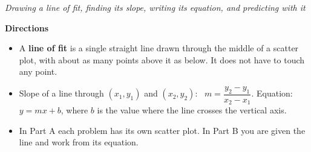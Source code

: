 \documentclass[12pt]{article}
\begin{document}

\begin{center}
\textit{Drawing a line of fit, finding its slope, writing its equation, and predicting with it}
\end{center}

\vspace{0.05cm}
\noindent\textbf{Directions}
\begin{itemize}[leftmargin=0.9cm, itemsep=1pt, topsep=2pt]
  \item A \textbf{line of fit} is a single straight line drawn through the middle of a scatter plot, with about as many points above it as below. It does not have to touch any point.
  \item Slope of a line through $(x_1, y_1)$ and $(x_2, y_2)$: \ $m = \dfrac{y_2 - y_1}{x_2 - x_1}$. \quad Equation: \ $y = mx + b$, where $b$ is the value where the line crosses the vertical axis.
  \item In Part A each problem has its own scatter plot. In Part B you are given the line and work from its equation.
\end{itemize}
\end{document}
